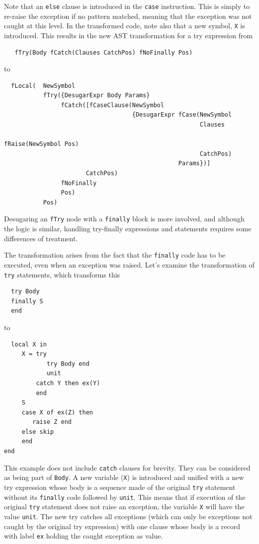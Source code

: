 \documentclass[a4paper]{memoir}
\begin{document}
Note that an \lstinline!else! clause is introduced in the \lstinline!case!
instruction. This is simply to re-raise the exception if no pattern matched,
meaning that the exception was not caught at this level.
In the transformed code, note also that a new symbol, \lstinline!X! is
introduced. 
\pagebreak[4]
This results in the new AST transformation for a try expression from
\begin{lstlisting}
   fTry(Body fCatch(Clauses CatchPos) fNoFinally Pos)
\end{lstlisting}
to
\begin{lstlisting}
  fLocal(  NewSymbol
           fTry({DesugarExpr Body Params} 
                fCatch([fCaseClause(NewSymbol 
                                    {DesugarExpr fCase(NewSymbol 
                                                       Clauses 
                                                       fRaise(NewSymbol Pos) 
                                                       CatchPos) 
                                                 Params})] 
                       CatchPos) 
                fNoFinally 
                Pos)
           Pos)
\end{lstlisting}

Desugaring an \lstinline!fTry! node with a \lstinline!finally! block is more
involved, and although the logic is similar, handling try-finally expressions and
statements requires some differences of treatment.

The transformation arises from the fact that the \lstinline!finally! code has to
be executed, even when an exception was raised.
Let's examine the transformation of \lstinline!try! statements, which
transforms this

\begin{lstlisting}
  try Body
  finally S 
  end
\end{lstlisting}

to

\begin{lstlisting}
  local X in 
     X = try 
            try Body end 
            unit 
         catch Y then ex(Y)
         end 
     S 
     case X of ex(Z) then 
        raise Z end 
     else skip 
     end 
end  
\end{lstlisting}

This example does not include \lstinline!catch! clauses for brevity. They can be considered
as being part of \lstinline!Body!.
A new variable (\lstinline!X!) is introduced and unified with a new try
expression whose body is a sequence made of the original \lstinline!try! statement
without its \lstinline!finally! code followed by \lstinline!unit!.
This means that if execution of the original \lstinline!try! statement does not raise an
exception, the variable \lstinline!X! will have the value \lstinline!unit!.
The new try catches all exceptions (which can only be exceptions not caught
by the original try expression) with one clause whose body is a record with label
\lstinline!ex! holding the caught exception as value.
\end{document}
